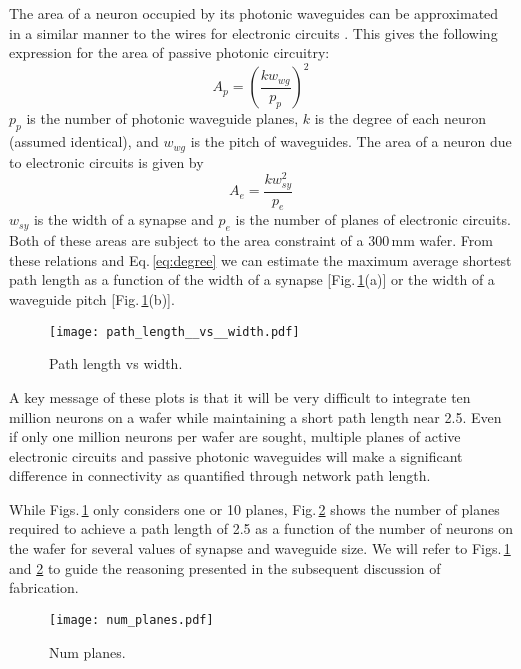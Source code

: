 \documentclass[twocolumn]{article}
\begin{document}
The area of a neuron occupied by its photonic waveguides can be approximated in a similar manner to the wires for electronic circuits \cite{ke1982}. This gives the following expression for the area of passive photonic circuitry:
\begin{equation}
\label{eq:area_p}
A_p = \left( \frac{k w_{wg}}{p_p} \right)^2
\end{equation}
$p_p$ is the number of photonic waveguide planes, $k$ is the degree of each neuron (assumed identical), and $w_{wg}$ is the pitch of waveguides. The area of a neuron due to electronic circuits is given by
\begin{equation}
\label{eq:area_e}
A_e = \frac{k w_{sy}^2}{p_e}
\end{equation}
$w_{sy}$ is the width of a synapse and $p_e$ is the number of planes of electronic circuits. Both of these areas are subject to the area constraint of a 300\,mm wafer. From these relations and Eq.\,\ref{eq:degree} we can estimate the maximum average shortest path length as a function of the width of a synapse [Fig.\,\ref{fig:path_length__vs__width}(a)] or the width of a waveguide pitch [Fig.\,\ref{fig:path_length__vs__width}(b)]. 
\begin{figure}[!h]
    \centering
    \texttt{[image: path\_length\_\_vs\_\_width.pdf]}
    \caption{Path length vs width.}
    \label{fig:path_length__vs__width}
\end{figure}
A key message of these plots is that it will be very difficult to integrate ten million neurons on a wafer while maintaining a short path length near 2.5. Even if only one million neurons per wafer are sought, multiple planes of active electronic circuits and passive photonic waveguides will make a significant difference in connectivity as quantified through network path length.

While Figs.\,\ref{fig:path_length__vs__width} only considers one or 10 planes, Fig.\,\ref{fig:num_planes} shows the number of planes required to achieve a path length of 2.5 as a function of the number of neurons on the wafer for several values of synapse and waveguide size. We will refer to Figs.\,\ref{fig:path_length__vs__width} and \ref{fig:num_planes} to guide the reasoning presented in the subsequent discussion of fabrication.
\begin{figure}
    \centering
    \texttt{[image: num\_planes.pdf]} 
    \caption{Num planes.}
    \label{fig:num_planes}
\end{figure}
\end{document}
